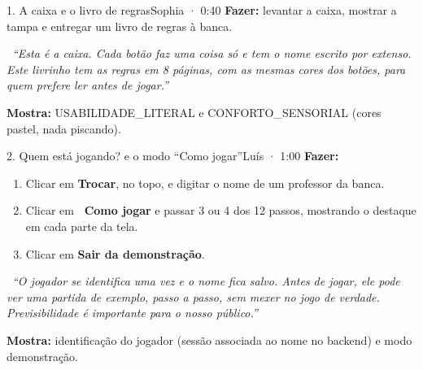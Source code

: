 \documentclass[11pt,a4paper]{article}
\newcommand{\fala}[1]{\par\smallskip\noindent\textcolor{verde}{\faComment[regular]}\ \textit{``#1''}\par}
\begin{document}
\begin{passo}{1. A caixa e o livro de regras}{Sophia · 0:40}
\textbf{Fazer:} levantar a caixa, mostrar a tampa e entregar um livro de regras à banca.
\fala{Esta é a caixa. Cada botão faz uma coisa só e tem o nome escrito por extenso. Este livrinho tem as regras em 8 páginas,
com as mesmas cores dos botões, para quem prefere ler antes de jogar.}
\textbf{Mostra:} USABILIDADE\_LITERAL e CONFORTO\_SENSORIAL (cores pastel, nada piscando).
\end{passo}

\begin{passo}{2. Quem está jogando? e o modo ``Como jogar''}{Luís · 1:00}
\textbf{Fazer:}
\begin{enumerate}
  \item Clicar em \textbf{Trocar}, no topo, e digitar o nome de um professor da banca.
  \item Clicar em \textbf{\faPlay\ Como jogar} e passar 3 ou 4 dos 12 passos, mostrando o destaque em cada parte da tela.
  \item Clicar em \textbf{Sair da demonstração}.
\end{enumerate}
\fala{O jogador se identifica uma vez e o nome fica salvo. Antes de jogar, ele pode ver uma partida de exemplo, passo a passo,
sem mexer no jogo de verdade. Previsibilidade é importante para o nosso público.}
\textbf{Mostra:} identificação do jogador (sessão associada ao nome no backend) e modo demonstração.
\end{passo}
\end{document}
